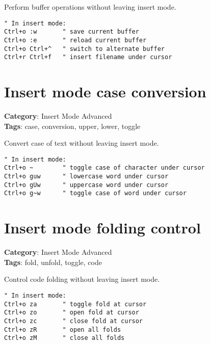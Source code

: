 {{{{{{Perform buffer operations without leaving insert mode.

\begin{Exa*}{}
\begin{Verbatim}[fontsize=\footnotesize, breaklines, breakanywhere]
" In insert mode:
Ctrl+o :w       " save current buffer
Ctrl+o :e       " reload current buffer
Ctrl+o Ctrl+^   " switch to alternate buffer
Ctrl+r Ctrl+f   " insert filename under cursor
\end{Verbatim}
\end{Exa*}

\section{Insert mode case conversion}

\textbf{Category}: Insert Mode Advanced\\ \textbf{Tags}: case, conversion, upper, lower, toggle
\vspace{0.5cm}

Convert case of text without leaving insert mode.

\begin{Exa*}{}
\begin{Verbatim}[fontsize=\footnotesize, breaklines, breakanywhere]
" In insert mode:
Ctrl+o ~        " toggle case of character under cursor  
Ctrl+o guw      " lowercase word under cursor
Ctrl+o gUw      " uppercase word under cursor
Ctrl+o g~w      " toggle case of word under cursor
\end{Verbatim}
\end{Exa*}

\section{Insert mode folding control}

\textbf{Category}: Insert Mode Advanced\\ \textbf{Tags}: fold, unfold, toggle, code
\vspace{0.5cm}

Control code folding without leaving insert mode.

\begin{Exa*}{}
\begin{Verbatim}[fontsize=\footnotesize, breaklines, breakanywhere]
" In insert mode:
Ctrl+o za       " toggle fold at cursor
Ctrl+o zo       " open fold at cursor
Ctrl+o zc       " close fold at cursor
Ctrl+o zR       " open all folds
Ctrl+o zM       " close all folds
\end{Verbatim}
\end{Exa*}

}}}}}}
